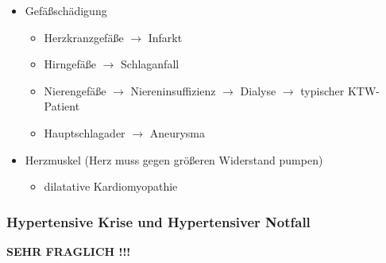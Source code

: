 \begin{itemize}
    \item Gefä{\ss}schädigung
    \begin{itemize}
        \item Herzkranzgefä{\ss}e ${\rightarrow}$ Infarkt
        \item Hirngefä{\ss}e ${\rightarrow}$ Schlaganfall
        \item Nierengefä{\ss}e ${\rightarrow}$ Niereninsuffizienz ${\rightarrow}$
        Dialyse ${\rightarrow}$ typischer KTW-Patient
        \item Hauptschlagader ${\rightarrow}$ Aneurysma        
    \end{itemize}
    \item Herzmuskel (Herz muss gegen gr\"o{\ss}eren Widerstand pumpen)
    \begin{itemize}
        \item dilatative Kardiomyopathie
    \end{itemize}
\end{itemize}

\subsubsection{Hypertensive Krise und Hypertensiver Notfall}

{\bfseries\color[rgb]{0.5019608,0.0,0.0} SEHR FRAGLICH !!!}

